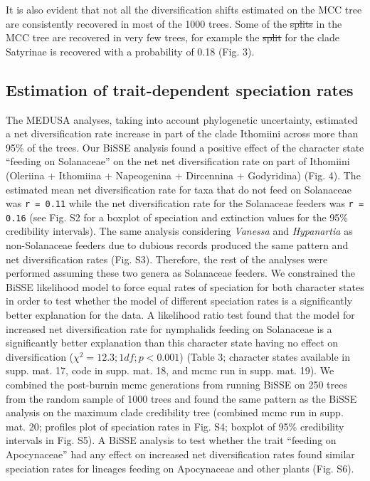 \documentclass[10pt]{article}
\providecommand{\DIFaddtex}[1]{{\protect\color{blue}\uwave{#1}}} %
\providecommand{\DIFdeltex}[1]{{\protect\color{red}\sout{#1}}}                      %
\providecommand{\DIFaddbegin}{} %
\providecommand{\DIFaddend}{} %
\providecommand{\DIFdelbegin}{} %
\providecommand{\DIFdelend}{} %
\providecommand{\DIFadd}[1]{\texorpdfstring{\DIFaddtex{#1}}{#1}} %
\providecommand{\DIFdel}[1]{\texorpdfstring{\DIFdeltex{#1}}{}} %
\begin{document}
It is also evident that not all the diversification shifts estimated on
the MCC tree are consistently recovered in most of the 1000 trees. Some
of the \DIFdelbegin \DIFdel{splits }\DIFdelend \DIFaddbegin \DIFadd{shifts }\DIFaddend in the MCC tree are recovered in very few trees, for
example the \DIFdelbegin \DIFdel{split }\DIFdelend \DIFaddbegin \DIFadd{shift }\DIFaddend for the clade Satyrinae is recovered with a
probability of 0.18 (Fig. 3).

\subsection*{Estimation of trait-dependent speciation
rates}

The MEDUSA analyses, taking into account phylogenetic uncertainty,
estimated a net diversification rate increase in part of the clade
Ithomiini across more than 95\% of the trees. Our BiSSE analysis found a
positive effect of the character state ``feeding on Solanaceae'' on the
net net diversification rate on part of Ithomiini (Oleriina + Ithomiina
+ Napeogenina + Dircennina + Godyridina) (Fig. 4). The estimated mean
net diversification rate for taxa that do not feed on Solanaceae was
\texttt{r = 0.11} while the net diversification rate for the Solanaceae
feeders was \texttt{r = 0.16} (see Fig. S2 for a boxplot of speciation
and extinction values for the 95\% credibility intervals). The same
analysis considering \emph{Vanessa} and \emph{Hypanartia} as
non-Solanaceae feeders due to dubious records produced the same pattern
and net diversification rates (Fig. S3). Therefore, the rest of the
analyses were performed assuming these two genera as Solanaceae feeders.
We constrained the BiSSE likelihood model to force equal rates of
speciation for both character states in order to test whether the model
of different speciation rates is a significantly better explanation for
the data. A likelihood ratio test found that the model for increased net
diversification rate for nymphalids feeding on Solanaceae is a
significantly better explanation than this character state having no
effect on diversification (\(\chi^2 = 12.3; 1 df; p < 0.001\)) (Table 3;
character states available in supp. mat. 17, code in supp. mat. 18, and
mcmc run in supp. mat. 19). We combined the post-burnin mcmc generations
from running BiSSE on 250 trees from the random sample of 1000 trees and
found the same pattern as the BiSSE analysis on the maximum clade
credibility tree (combined mcmc run in supp. mat. 20; profiles plot of
speciation rates in Fig. S4; boxplot of 95\% credibility intervals in
Fig. S5). A BiSSE analysis to test whether the trait ``feeding on
Apocynaceae'' had any effect on increased net diversification rates
found similar speciation rates for lineages feeding on Apocynaceae and
other plants (Fig. S6).
\end{document}
